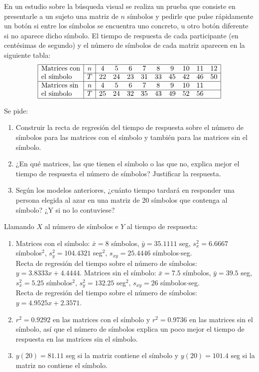 {En un estudio sobre la búsqueda visual se realiza un prueba que consiste en presentarle a un sujeto una matriz de $n$
símbolos y pedirle que pulse rápidamente un botón si entre los símbolos se encuentra uno concreto, u otro botón
diferente si no aparece dicho símbolo.
El tiempo de respuesta de cada participante (en centésimas de segundo) y el número de símbolos de cada matriz aparecen
en la siguiente tabla:
\[
\begin{array}{|l|c|ccccccccc|}
\hline
\mbox{Matrices con} & n & 4 & 5 & 6 & 7 & 8 & 9 & 10 & 11 & 12\\
\cline{2-11}
\mbox{el símbolo} & T & 22 & 24 & 23 & 31 & 33 & 45 & 42 & 46 & 50\\
\hline
\mbox{Matrices sin} & n & 4 & 5 & 6 & 7 & 8 & 9 & 10 & 11 & \\
\cline{2-11}
\mbox{el símbolo} & T & 25 & 24 & 32 & 35 & 43 & 49 & 52 & 56 &\\
\hline
\end{array}
\]

Se pide:
\begin{enumerate}
\item Construir la recta de regresión del tiempo de respuesta sobre el número de símbolos para las matrices con el
símbolo y también para las matrices sin el símbolo.
\item ¿En qué matrices, las que tienen el símbolo o las que no, explica mejor el tiempo de respuesta el número de símbolos?
Justificar la respuesta.
\item Según los modelos anteriores, ¿cuánto tiempo tardará en responder una persona elegida al azar en una matriz de 20
símbolos que contenga al símbolo?
¿Y si no lo contuviese?
\end{enumerate}
}
{Llamando $X$ al número de símbolos e $Y$ al tiempo de respuesta:
\begin{enumerate}
\item Matrices con el símbolo: $\bar x=8$ símbolos, $\bar y=35.1111$ seg, $s_x^2=6.6667$ símbolos$^2$, $s_y^2=104.4321$
seg$^2$, $s_{xy}=25.4446$ símbolos$\cdot$seg.\\
Recta de regresión del tiempo sobre el número de símbolos: $y=3.8333x+4.4444$.
Matrices sin el símbolo: $\bar x=7.5$ símbolos, $\bar y=39.5$ seg, $s_x^2=5.25$ símbolos$^2$, $s_y^2=132.25$
seg$^2$, $s_{xy}=26$ símbolos$\cdot$seg.\\
Recta de regresión del tiempo sobre el número de símbolos: $y=4.9525x+2.3571$.
\item $r^2=0.9292$ en las matrices con el símbolo y $r^2=0.9736$ en las matrices sin el símbolo, así que el número de
símbolos explica un poco mejor el tiempo de respuesta en las matrices sin el símbolo.
\item $y(20)=81.11$ seg si la matriz contiene el símbolo y $y(20)=101.4$ seg si la matriz no contiene el símbolo.
\end{enumerate}
}
{}


